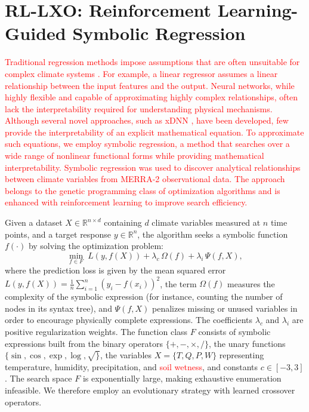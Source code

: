 \documentclass{article}
\begin{document}
\section{RL-LXO: Reinforcement Learning-Guided Symbolic Regression}

\textcolor{red}{Traditional regression methods impose assumptions that are often unsuitable for complex climate systems \citep{knutti2015feedbacks}. For example, a linear regressor assumes a linear relationship between the input features and the output. Neural networks, while highly flexible and capable of approximating highly complex relationships, often lack the interpretability required for understanding physical mechanisms. Although several novel approaches, such as xDNN \citep{angelov2020towards}, have been developed, few provide the interpretability of an explicit mathematical equation. To approximate such equations, we employ symbolic regression, a method that searches over a wide range of nonlinear functional forms while providing mathematical interpretability. Symbolic regression was used to discover analytical relationships between climate variables from MERRA-2 observational data. The approach belongs to the genetic programming class of optimization algorithms and is enhanced with reinforcement learning to improve search efficiency.}

Given a dataset $X \in \mathbb{R}^{n \times d}$ containing $d$ climate variables measured at $n$ time points, and a target response $y \in \mathbb{R}^n$, the algorithm seeks a symbolic function $f(\cdot)$ by solving the optimization problem:
\begin{equation}
\label{eq:sr_objective}
\min_{f \in {F}} \; {L}(y, f(X)) + \lambda_c\,\Omega(f) + \lambda_i\,\Psi(f, X),
\end{equation}
where the prediction loss is given by the mean squared error $ {L}(y, f(X)) = \frac{1}{n} \sum_{i=1}^{n} (y_i - f(x_i))^2$, the term \(\Omega(f)\) measures the complexity of the  symbolic expression (for instance, counting the number of nodes in its syntax tree), and \(\Psi(f, X)\) penalizes missing or unused variables in order to encourage physically complete expressions. The coefficients \(\lambda_c\) and \(\lambda_i\) are positive regularization weights. The function class \({F}\) consists of symbolic expressions built from the binary operators \(\{+, -, \times, /\}\), the unary functions \(\{\sin, \cos, \exp, \log, \sqrt\}\), the variables \(X = \{T, Q, P, W\}\) representing temperature, humidity, precipitation, and \textcolor{red}{soil wetness}, and constants \(c \in [-3, 3]\). The search space ${F}$ is exponentially large, making exhaustive enumeration infeasible. We therefore employ an evolutionary strategy with learned crossover operators.
\end{document}
